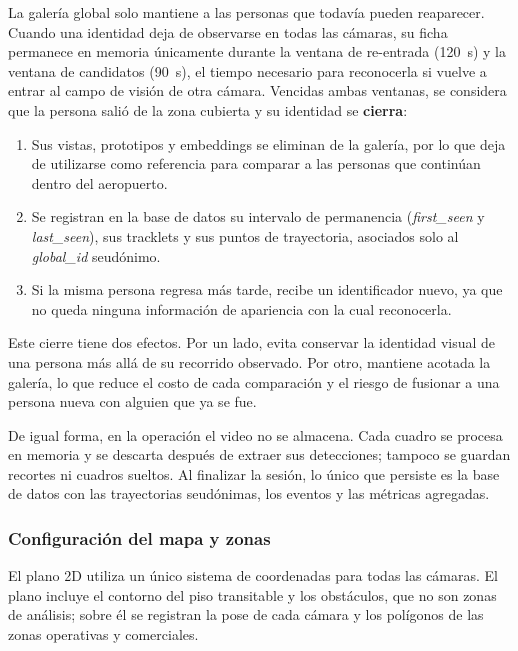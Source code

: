 \documentclass[12pt,a4paper]{article}
\begin{document}
La galería global solo mantiene a las personas que todavía pueden
reaparecer. Cuando una identidad deja de observarse en todas las
cámaras, su ficha permanece en memoria únicamente durante la ventana de
re-entrada (120~s) y la ventana de candidatos (90~s), el tiempo
necesario para reconocerla si vuelve a entrar al campo de visión de
otra cámara. Vencidas ambas ventanas, se considera que la persona salió
de la zona cubierta y su identidad se \textbf{cierra}:

\begin{enumerate}
    \item Sus vistas, prototipos y embeddings se eliminan de la galería,
    por lo que deja de utilizarse como referencia para comparar a las
    personas que continúan dentro del aeropuerto.
    \item Se registran en la base de datos su intervalo de permanencia
    (\textit{first\_seen} y \textit{last\_seen}), sus tracklets y sus
    puntos de trayectoria, asociados solo al \textit{global\_id}
    seudónimo.
    \item Si la misma persona regresa más tarde, recibe un identificador
    nuevo, ya que no queda ninguna información de apariencia con la cual
    reconocerla.
\end{enumerate}

Este cierre tiene dos efectos. Por un lado, evita conservar la identidad
visual de una persona más allá de su recorrido observado. Por otro,
mantiene acotada la galería, lo que reduce el costo de cada comparación
y el riesgo de fusionar a una persona nueva con alguien que ya se fue.

De igual forma, en la operación el video no se almacena. Cada cuadro se procesa en
memoria y se descarta después de extraer sus detecciones; tampoco se
guardan recortes ni cuadros sueltos. Al finalizar la sesión, lo único
que persiste es la base de datos con las trayectorias seudónimas, los
eventos y las métricas agregadas.

\subsubsection{Configuración del mapa y zonas}

El plano 2D utiliza un único sistema de coordenadas para todas las
cámaras. El plano incluye el contorno del piso transitable y los
obstáculos, que no son zonas de análisis; sobre él se registran la pose de
cada cámara y los polígonos de las zonas operativas y comerciales.
\end{document}
